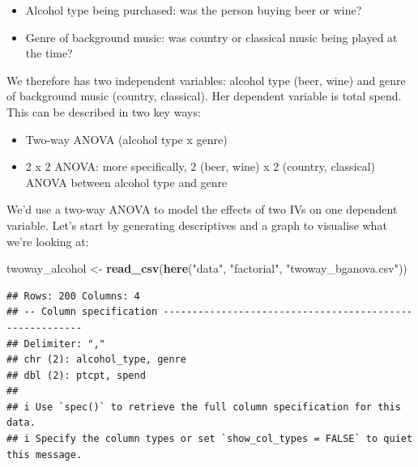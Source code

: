 \documentclass[
]{book}
\newenvironment{Shaded}{\begin{snugshade}}{\end{snugshade}}
\newcommand{\FunctionTok}[1]{\textcolor[rgb]{0.13,0.29,0.53}{\textbf{#1}}}
\newcommand{\NormalTok}[1]{#1}
\newcommand{\OtherTok}[1]{\textcolor[rgb]{0.56,0.35,0.01}{#1}}
\newcommand{\StringTok}[1]{\textcolor[rgb]{0.31,0.60,0.02}{#1}}
\providecommand{\tightlist}{%
  \setlength{\itemsep}{0pt}\setlength{\parskip}{0pt}}
\begin{document}
\begin{itemize}
\tightlist
\item
  Alcohol type being purchased: was the person buying beer or wine?
\item
  Genre of background music: was country or classical music being played at the time?
\end{itemize}

We therefore has two independent variables: alcohol type (beer, wine) and genre of background music (country, classical). Her dependent variable is total spend. This can be described in two key ways:

\begin{itemize}
\tightlist
\item
  Two-way ANOVA (alcohol type x genre)
\item
  2 x 2 ANOVA: more specifically, 2 (beer, wine) x 2 (country, classical) ANOVA between alcohol type and genre
\end{itemize}

We'd use a two-way ANOVA to model the effects of two IVs on one dependent variable. Let's start by generating descriptives and a graph to visualise what we're looking at:

\begin{Shaded}
\begin{Highlighting}[]
\NormalTok{twoway\_alcohol }\OtherTok{\textless{}{-}} \FunctionTok{read\_csv}\NormalTok{(}\FunctionTok{here}\NormalTok{(}\StringTok{"data"}\NormalTok{, }\StringTok{"factorial"}\NormalTok{, }\StringTok{"twoway\_bganova.csv"}\NormalTok{))}
\end{Highlighting}
\end{Shaded}

\begin{verbatim}
## Rows: 200 Columns: 4
## -- Column specification --------------------------------------------------------
## Delimiter: ","
## chr (2): alcohol_type, genre
## dbl (2): ptcpt, spend
## 
## i Use `spec()` to retrieve the full column specification for this data.
## i Specify the column types or set `show_col_types = FALSE` to quiet this message.
\end{verbatim}
\end{document}
